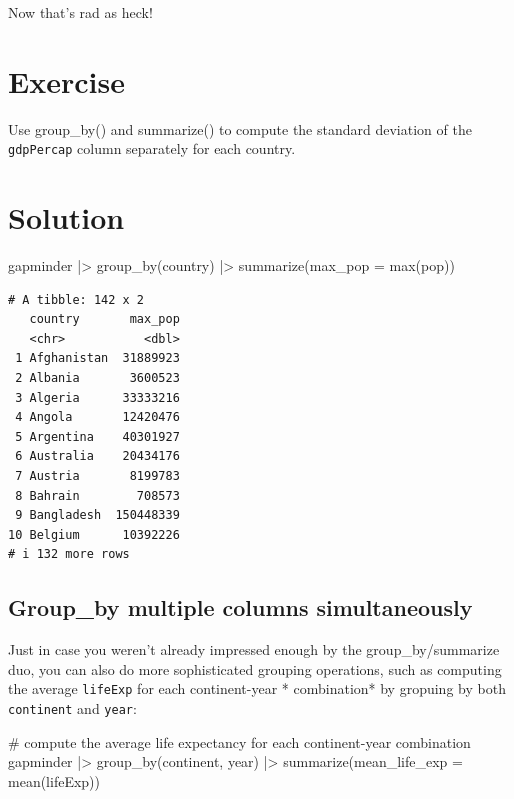 \documentclass[
  letterpaper,
  DIV=11,
  numbers=noendperiod]{scrreprt}
\newenvironment{Shaded}{\begin{snugshade}}{\end{snugshade}}
\newcommand{\AttributeTok}[1]{\textcolor[rgb]{0.40,0.45,0.13}{#1}}
\newcommand{\CommentTok}[1]{\textcolor[rgb]{0.37,0.37,0.37}{#1}}
\newcommand{\FunctionTok}[1]{\textcolor[rgb]{0.28,0.35,0.67}{#1}}
\newcommand{\NormalTok}[1]{\textcolor[rgb]{0.00,0.23,0.31}{#1}}
\newcommand{\SpecialCharTok}[1]{\textcolor[rgb]{0.37,0.37,0.37}{#1}}
\begin{document}
Now that's rad as heck!

\section{Exercise}

Use group\_by() and summarize() to compute the standard deviation of the
\texttt{gdpPercap} column separately for each country.

\section{Solution}

\begin{Shaded}
\begin{Highlighting}[]
\NormalTok{gapminder }\SpecialCharTok{|\textgreater{}} 
  \FunctionTok{group\_by}\NormalTok{(country) }\SpecialCharTok{|\textgreater{}} 
  \FunctionTok{summarize}\NormalTok{(}\AttributeTok{max\_pop =} \FunctionTok{max}\NormalTok{(pop))}
\end{Highlighting}
\end{Shaded}

\begin{verbatim}
# A tibble: 142 x 2
   country       max_pop
   <chr>           <dbl>
 1 Afghanistan  31889923
 2 Albania       3600523
 3 Algeria      33333216
 4 Angola       12420476
 5 Argentina    40301927
 6 Australia    20434176
 7 Austria       8199783
 8 Bahrain        708573
 9 Bangladesh  150448339
10 Belgium      10392226
# i 132 more rows
\end{verbatim}

\subsection{Group\_by multiple columns
simultaneously}\label{group_by-multiple-columns-simultaneously}

Just in case you weren't already impressed enough by the
group\_by/summarize duo, you can also do more sophisticated grouping
operations, such as computing the average \texttt{lifeExp} for each
continent-year * combination* by gropuing by both \texttt{continent} and
\texttt{year}:

\begin{Shaded}
\begin{Highlighting}[]
\CommentTok{\# compute the average life expectancy for each continent{-}year combination}
\NormalTok{gapminder }\SpecialCharTok{|\textgreater{}} 
  \FunctionTok{group\_by}\NormalTok{(continent, year) }\SpecialCharTok{|\textgreater{}} 
  \FunctionTok{summarize}\NormalTok{(}\AttributeTok{mean\_life\_exp =} \FunctionTok{mean}\NormalTok{(lifeExp))}
\end{Highlighting}
\end{Shaded}
\end{document}
